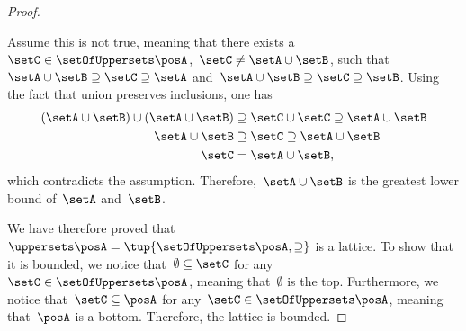 \begin{proof}
\begin{compactitem}
              Assume this is not true, meaning that there exists a~$\setC\in \setOfUppersets \posA$,~$\setC\neq \setA\cup \setB$, such that~$\setA\cup \setB\supseteq \setC\supseteq \setA$ and~$\setA\cup \setB\supseteq \setC\supseteq \setB$.
              Using the fact that union preserves inclusions, one has
              \begin{equation}
                  \begin{aligned}
                      (\setA\cup \setB)
                      \cup (\setA\cup \setB) & \supseteq \setC \cup \setC \supseteq \setA\cup \setB \\
                      \setA\cup \setB        & \supseteq \setC\supseteq \setA\cup \setB             \\
                      \setC                  & =\setA\cup \setB,
                  \end{aligned}
              \end{equation}
              which contradicts the assumption.
              Therefore,~$\setA\cup \setB$ is the greatest lower bound of~$\setA$ and~$\setB$.
    \end{compactitem}
    We have therefore proved that~$\uppersets \posA=\tup{\setOfUppersets \posA,\supseteq}$ is a lattice.
    To show that it is bounded, we notice that~$\emptyset \subseteq \setC$ for any~$\setC\in \setOfUppersets \posA$, meaning that~$\emptyset$ is the top.
    Furthermore, we notice that~$\setC\subseteq \posA$ for any~$\setC\in \setOfUppersets \posA$, meaning that~$\posA$ is a bottom.
    Therefore, the lattice is bounded.
\end{proof}

